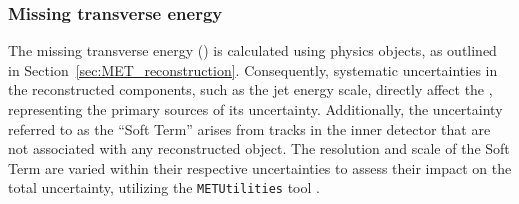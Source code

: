 

\subsubsection*{Missing transverse energy}
The missing transverse energy (\met) is calculated using physics objects, as outlined in Section~\ref{sec:MET_reconstruction}. 
Consequently, systematic uncertainties in the reconstructed components, such as the jet energy scale, directly affect the \met, representing the primary sources of its uncertainty. 
Additionally, the uncertainty referred to as the ``Soft Term'' arises from tracks in the inner detector that are not associated with any reconstructed object.
The resolution and scale of the Soft Term are varied within their respective uncertainties to assess their impact on the total \met uncertainty, utilizing the \texttt{METUtilities} tool \cite{METUtilSystematics}.



